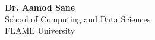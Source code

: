 \vspace{-\parskip}
\begingroup
\singlespacing
\begin{flushright}
\textbf{Dr. Aamod Sane}                    \\
School of Computing and Data Sciences       \\
FLAME University                            \\
\end{flushright}
\endgroup
\par
